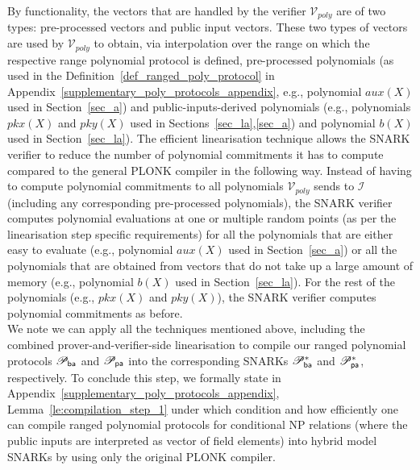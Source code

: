 \noindent By functionality, the vectors that are handled by the verifier $\mathcal{V}_{poly}$ are 
of two types: pre-processed vectors and public input vectors. These two types of vectors are used by $\mathcal{V}_{poly}$ 
to obtain, via interpolation over the range on which the respective range polynomial protocol is defined, pre-processed polynomials 
(as used in the Definition~\ref{def_ranged_poly_protocol} in Appendix~\ref{supplementary_poly_protocols_appendix}, e.g., polynomial $aux(X)$ used in Section~\ref{sec_a}) and 
public-inputs-derived polynomials (e.g., polynomials $pkx(X)$ and $pky(X)$ used in Sections~\ref{sec_la},\ref{sec_a})
and polynomial $b(X)$ used in Section~\ref{sec_la}). The efficient linearisation technique allows the SNARK verifier to reduce the 
number of polynomial commitments it has to compute compared to the general PLONK compiler in the following way. Instead of 
having to compute polynomial commitments to all polynomials $\mathcal{V}_{poly}$ sends to $\mathcal{I}$ (including any corresponding 
pre-processed polynomials), the SNARK verifier computes polynomial evaluations at one or multiple random points (as per the linearisation 
step specific requirements) for all the polynomials that are either easy to evaluate (e.g., polynomial $aux(X)$ used in Section~\ref{sec_a}) or 
all the polynomials that are obtained from vectors that do not take up a large amount of memory (e.g., polynomial $b(X)$ used in Section~\ref{sec_la}). 
For the rest of the polynomials (e.g., $\mathit{pkx}(X)$ and $\mathit{pky}(X)$), the SNARK verifier computes polynomial commitments as before.\\

\noindent We note we can apply all the techniques mentioned above, including the combined prover-and-verifier-side linearisation 
to compile our ranged polynomial protocols $\mathscr{P}_{\mathsf{ba}}$ and $\mathscr{P}_{\mathsf{pa}}$ into the corresponding SNARKs $\mathscr{P}_{\mathsf{ba}}^{\ast}$ and $\mathscr{P}_{\mathsf{pa}}^{\ast}$, respectively. 
To conclude this step, we formally state in Appendix~\ref{supplementary_poly_protocols_appendix}, Lemma~\ref{le:compilation_step_1} under which condition and how efficiently 
one can compile ranged polynomial protocols for conditional NP relations (where the public inputs are interpreted as vector of field elements) 
into hybrid model SNARKs by using only the original PLONK compiler. \\
